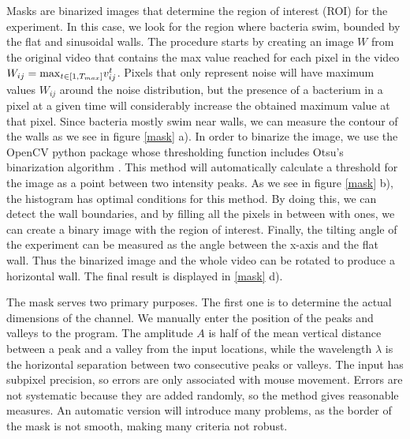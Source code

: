 Masks are binarized images that determine the region of interest (ROI) for the experiment. In this case,  we look for the region where bacteria swim, bounded by the flat and sinusoidal walls. The procedure starts by creating an image $W$ from the original video that contains the max value reached for each pixel in the video $W_{ij}={\rm max}_{t\in[1,T_{max}]} v_{ij}^t$. Pixels that only represent noise will have maximum values $W_{ij}$ around the noise distribution, but the presence of a bacterium in a pixel at a given time will considerably increase the obtained maximum value at that pixel. Since bacteria mostly swim near walls, we can measure the contour of the walls as we see in figure \ref{mask} a). In order to binarize the image, we use the OpenCV python package whose thresholding function includes Otsu's binarization algorithm \cite{Grdiet2013BinarizationABSTARCT}. This method will automatically calculate a threshold for the image as a point between two intensity peaks. As we see in figure \ref{mask} b), the histogram has optimal conditions for this method. By doing this, we can detect the wall boundaries, and by filling all the pixels in between with ones, we can create a binary image with the region of interest. Finally, the tilting angle of the experiment can be measured as the angle between the x-axis and the flat wall. Thus the binarized image and the whole video can be rotated to produce a horizontal wall. The final result is displayed in \ref{mask} d).


The mask serves two primary purposes. The first one is to determine the actual dimensions of the channel. We manually enter the position of the peaks and valleys to the program. The amplitude $A$ is half of the mean vertical distance between a peak and a valley from the input locations, while the wavelength $\lambda$ is the horizontal separation between two consecutive peaks or valleys. The input has subpixel precision, so errors are only associated with mouse movement. Errors are not systematic because they are added randomly, so the method gives reasonable measures.  An automatic version will introduce many problems, as the border of the mask is not smooth, making many criteria not robust. 

